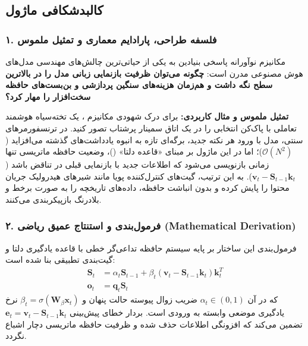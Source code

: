 \subsection{کالبدشکافی ماژول }

\subsubsection*{۱. فلسفه طراحی، پارادایم معماری و تمثیل ملموس}
مکانیزم نوآورانه  پاسخی بنیادین به یکی از حیاتی‌ترین چالش‌های مهندسی مدل‌های هوش مصنوعی مدرن است: \textbf{چگونه می‌توان ظرفیت بازنمایی زبانی مدل را در بالاترین سطح نگه داشت و هم‌زمان هزینه‌های سنگین پردازشی و بن‌بست‌های حافظه سخت‌افزار را مهار کرد؟}

\textbf{تمثیل ملموس و مثال کاربردی:}
برای درک شهودی مکانیزم ، یک تخته‌سیاه هوشمند تعاملی با پاک‌کن انتخابی را در یک اتاق سمینار پرشتاب تصور کنید. در ترنسفورمرهای سنتی، مدل با ورود هر نکته جدید، برگه‌ای تازه به انبوه یادداشت‌های گذشته می‌افزاید ($\mathcal{O}(N^2)$)؛ اما در این ماژول بر مبنای «قاعده دلتا» ()، وضعیت حافظه ماتریسی تنها زمانی بازنویسی می‌شود که اطلاعات جدید با بازنمایی قبلی در تناقض باشد ($\mathbf{v}_t - \mathbf{S}_{t-1}\mathbf{k}_t$). به این ترتیب، گیت‌های کنترل‌کننده پویا مانند شیرهای هیدرولیک جریان محتوا را پایش کرده و بدون انباشت حافظه، داده‌های تاریخچه را به صورت برخط و بلادرنگ بازپیکربندی می‌کنند.

\subsubsection*{۲. فرمول‌بندی و استنتاج عمیق ریاضی (Mathematical Derivation)}
فرمول‌بندی این ساختار بر پایه سیستم حافظه تداعی‌گر خطی با قاعده یادگیری دلتا و گیت‌بندی تطبیقی بنا شده است:
\begin{align}
\mathbf{S}_t &= \alpha_t \mathbf{S}_{t-1} + \beta_t (\mathbf{v}_t - \mathbf{S}_{t-1}\mathbf{k}_t) \mathbf{k}_t^T \\
\mathbf{o}_t &= \mathbf{q}_t \mathbf{S}_t
\end{align}
که در آن $\alpha_t \in (0, 1)$ ضریب زوال پیوسته حالت پنهان و $\beta_t = \sigma(\mathbf{W}_\beta \mathbf{x}_t)$ نرخ یادگیری موضعی وابسته به ورودی است. بردار خطای پیش‌بینی $\mathbf{e}_t = \mathbf{v}_t - \mathbf{S}_{t-1}\mathbf{k}_t$ تضمین می‌کند که افزونگی اطلاعات حذف شده و ظرفیت حافظه ماتریسی دچار اشباع نگردد.

